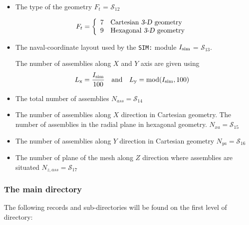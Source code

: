 \begin{itemize}
\item The type of the geometry $F_{t}$ = $\mathcal{S}_{12}$

\begin{displaymath} F_{t} = \left\{
\begin{array}{rl}
 7 & \textrm{Cartesian \dusa{3-D} geometry} \\
 9 & \textrm{Hexagonal \dusa{3-D} geometry} \\
\end{array} \right.
\end{displaymath}

\item The naval-coordinate layout used by the {\tt SIM:} module $I_{\rm sim}$ = $\mathcal{S}_{13}$.

\vskip 0.08cm

The number of assemblies along $X$ and $Y$ axis are given using
$$
L_{\rm x}={I_{\rm sim}\over 100} \ \ \ {\rm and} \ \ \ L_{\rm y}={\rm mod}(I_{\rm sim},100)
$$

\item The total number of assemblies $N_{ass} = \mathcal{S}_{14}$

\item The number of assemblies along $X$ direction in Cartesian geometry.  The number of assemblies in the radial plane in hexagonal geometry. $N_{xa} = \mathcal{S}_{15}$

\item The number of assemblies along $Y$ direction in Cartesian geometry $N_{ya} = \mathcal{S}_{16}$

\item The number of plane of the mesh along $Z$ direction where assemblies are situated $N_{z,ass} = \mathcal{S}_{17}$

\end{itemize}

\subsubsection{The main  directory}\label{sect:fmapdir}

\noindent
The following records and sub-directories will be found on the first level of 
directory:

